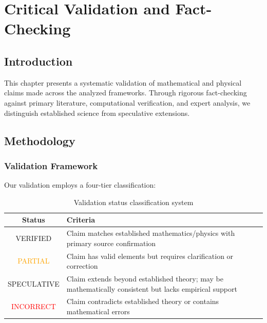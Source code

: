 
\chapter{Critical Validation and Fact-Checking}
\label{ch:validation}

\section{Introduction}

This chapter presents a systematic validation of mathematical and physical claims made across the analyzed frameworks. Through rigorous fact-checking against primary literature, computational verification, and expert analysis, we distinguish established science from speculative extensions.

\section{Methodology}

\subsection{Validation Framework}

Our validation employs a four-tier classification:

\begin{table}[h]
\centering
\begin{tabular}{cp{10cm}}
\toprule
\textbf{Status} & \textbf{Criteria} \\
\midrule
\textcolor{validcolor}{VERIFIED} & Claim matches established mathematics/physics with primary source confirmation \\
\textcolor{orange}{PARTIAL} & Claim has valid elements but requires clarification or correction \\
\textcolor{claimcolor}{SPECULATIVE} & Claim extends beyond established theory; may be mathematically consistent but lacks empirical support \\
\textcolor{red}{INCORRECT} & Claim contradicts established theory or contains mathematical errors \\
\bottomrule
\end{tabular}
\caption{Validation status classification system}
\end{table}


